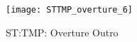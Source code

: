 \begin{figure}
\center
\texttt{[image: STTMP\_overture\_6]}
	\caption{ST:TMP: Overture Outro}
	\label{fg:sttmp_overture_6}
\end{figure}

\clearpage


